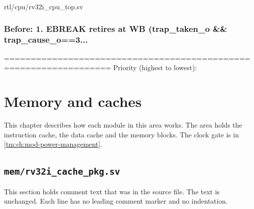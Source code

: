 \begin{relocated}{rtl/cpu/rv32i_cpu_top.sv}
\subsection*{Before: 1. EBREAK retires at WB (trap\_taken\_o \&\& trap\_cause\_o==3...}

\begin{textblock}
==================================================================
Priority (highest to lowest):
\end{textblock}

\end{relocated}








\chapter{Memory and caches}\label{tm:ch:mod-memory-and-caches}

This chapter describes how each module in this area works. The area holds the instruction cache, the data cache and the memory blocks. The clock gate  is in \cref{tm:ch:mod-power-management}.

\section{\texttt{mem/rv32i\_cache\_pkg.sv}}\label{tm:mod:rv32i-cache-pkg}

This section holds comment text that was in the source file. The text is unchanged. Each line has no leading comment marker and no indentation.

